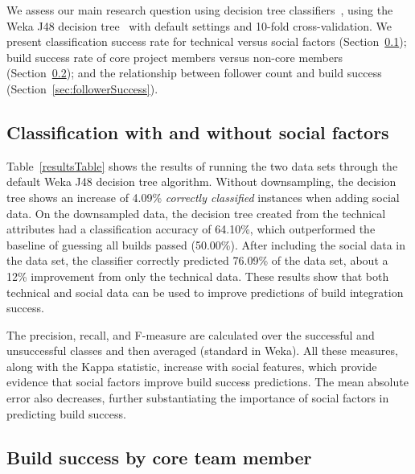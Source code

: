 \documentclass[10pt, conference]{IEEEtran}
\begin{document}
We assess our main research question using decision tree
classifiers~\cite{Quinlan86}, using
%
the Weka J48 decision tree~\cite{Weka,Quinlan1993}
with default settings and 10-fold 
cross-validation.
We present classification
success rate for technical versus social factors
(Section~\ref{sec:successClassification}); 
build success rate of core project members versus non-core 
members (Section~\ref{sec:core}); and the relationship 
between follower count and build success (Section~\ref{sec:followerSuccess}).

\subsection{Classification with and without social factors}
\label{sec:successClassification}

Table~\ref{resultsTable} shows the results of running the two data sets through the
default Weka J48 decision tree algorithm.  Without downsampling, the 
decision tree shows an increase of 4.09\% \textit{correctly classified} instances when adding social data. On the downsampled data, the decision tree created from the technical attributes
had a classification accuracy of 64.10\%, which outperformed the baseline of
guessing all builds passed (50.00\%).
After including the social data
in the data set, the classifier correctly predicted 76.09\% of the data set,
about a 12\% improvement from only the technical data.  These results show that
both technical and social data can be used to improve predictions of build 
integration success.

The precision, recall, and
F-measure are calculated over the successful and unsuccessful classes and then
averaged (standard in Weka).  All these measures, along with the Kappa
statistic, increase with social features, which provide evidence that social 
factors improve build success predictions. The mean 
absolute error also decreases, further substantiating the importance 
of social factors
in predicting build success.

\subsection{Build success by core team member}
\label{sec:core}
\end{document}
